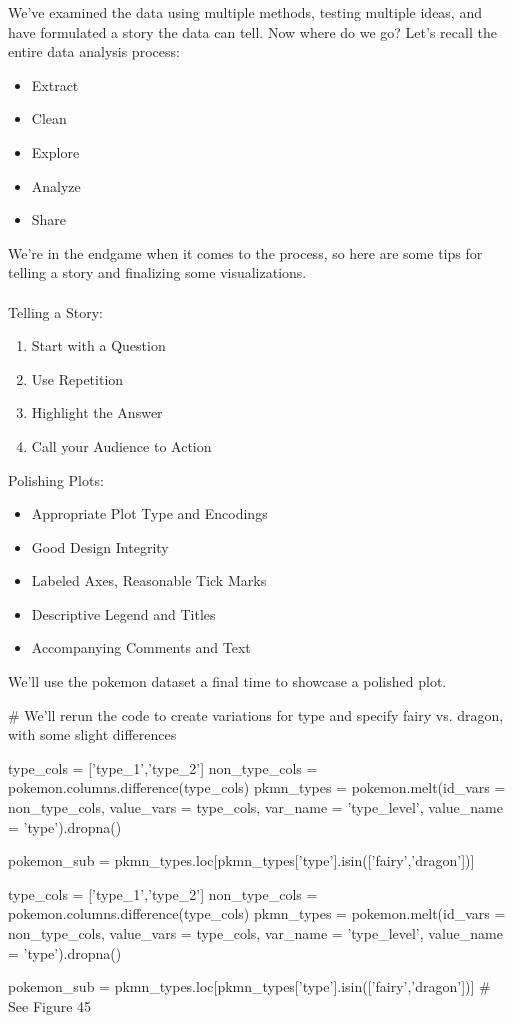 We've examined the data using multiple methods, testing multiple ideas, and have formulated a story the data can tell. Now where do we go? Let's recall the entire data analysis process:

\begin{itemize}
	\item Extract
	\item Clean
	\item Explore
	\item Analyze
	\item Share
\end{itemize} 

We're in the endgame when it comes to the process, so here are some tips for telling a story and finalizing some visualizations.
\\\\

Telling a Story:
\begin{enumerate}
	\item Start with a Question
	\item Use Repetition
	\item Highlight the Answer
	\item Call your Audience to Action
\end{enumerate}

Polishing Plots:
\begin{itemize}
	\item Appropriate Plot Type and Encodings
	\item Good Design Integrity
	\item Labeled Axes, Reasonable Tick Marks
	\item Descriptive Legend and Titles
	\item Accompanying Comments and Text
\end{itemize}

We'll use the pokemon dataset a final time to showcase a polished plot.

\begin{python}
	# We'll rerun the code to create variations for type and specify fairy vs. dragon, with some slight differences
	
	type_cols = ['type_1','type_2']
	non_type_cols = pokemon.columns.difference(type_cols)
	pkmn_types = pokemon.melt(id_vars = non_type_cols, value_vars = type_cols, var_name = 'type_level', value_name = 'type').dropna()
	
	pokemon_sub = pkmn_types.loc[pkmn_types['type'].isin(['fairy','dragon'])]
	
	type_cols = ['type_1','type_2']
	non_type_cols = pokemon.columns.difference(type_cols)
	pkmn_types = pokemon.melt(id_vars = non_type_cols, value_vars = type_cols, 
	var_name = 'type_level', value_name = 'type').dropna()
	
	pokemon_sub = pkmn_types.loc[pkmn_types['type'].isin(['fairy','dragon'])]
	# See Figure 45
\end{python}

